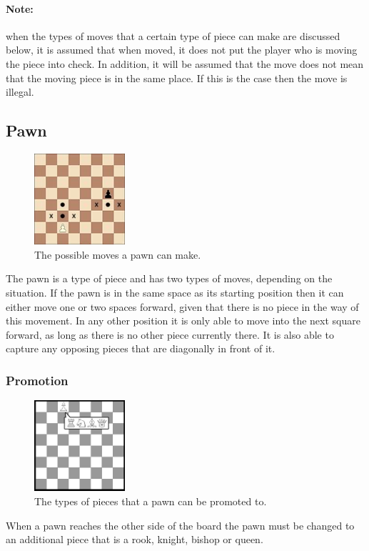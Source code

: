 \paragraph{Note:}when the types of moves that a certain type of piece can make are discussed below, it is assumed that when moved, it does not put the player who is moving the piece into check. In addition, it will be assumed that the move does not mean that the moving piece is in the same place. If this is the case then the move is illegal.
\subsection{Pawn}
\begin{figure}[H]
\centering
	\includegraphics[width=0.3\textwidth]{images/boards/pawn_movement}
	\caption{The possible moves a pawn can make.}
\end{figure}
The pawn is a type of piece and has two types of moves, depending on the situation. If the pawn is in the same space as its starting position then it can either move one or two spaces forward, given that there is no piece in the way of this movement. In any other position it is only able to move into the next square forward, as long as there is no other piece currently there. It is also able to capture any opposing pieces that are diagonally in front of it.
\subsubsection{Promotion}
\begin{figure}[H]
\centering
	\includegraphics[width=0.3\textwidth]{images/boards/promotion}
	\caption{The types of pieces that a pawn can be promoted to.}
\end{figure}
When a pawn reaches the other side of the board the pawn must be changed to an additional piece that is a rook, knight, bishop or queen.
